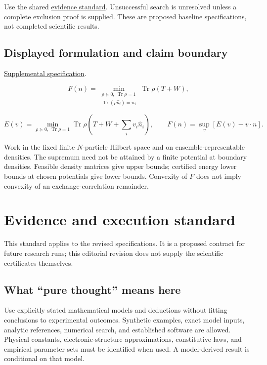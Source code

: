 \documentclass[
  11pt,
]{article}
\begin{document}
Use the shared
\href{https://github.com/rick-stevens-ai/Pure-Thought/blob/main/reviews/EVIDENCE-STANDARD.md}{evidence
standard}. Unsuccessful search is unresolved unless a complete exclusion
proof is supplied. These are proposed baseline specifications, not
completed scientific results.

\subsection{Displayed formulation and claim boundary}

\href{https://github.com/rick-stevens-ai/Pure-Thought/blob/main/supplemental/S05.md}{Supplemental
specification}.

\[F(n)=\min_{\substack{\rho\succeq0,\ \operatorname{Tr}\rho=1\\
\operatorname{Tr}(\rho\widehat n_i)=n_i}}
\operatorname{Tr}\rho(T+W),\]

\[E(v)=\min_{\rho\succeq0,\ \operatorname{Tr}\rho=1}
\operatorname{Tr}\rho\!\left(T+W+\sum_i v_i\widehat n_i\right),
\qquad F(n)=\sup_v[E(v)-v\cdot n].\]

Work in the fixed finite \(N\)-particle Hilbert space and on
ensemble-representable densities. The supremum need not be attained by a
finite potential at boundary densities. Feasible density matrices give
upper bounds; certified energy lower bounds at chosen potentials give
lower bounds. Convexity of \(F\) does not imply convexity of an
exchange-correlation remainder.

\section{Evidence and execution standard}

This standard applies to the revised specifications. It is a proposed
contract for future research runs; this editorial revision does not
supply the scientific certificates themselves.

\subsection{What ``pure thought'' means here}

Use explicitly stated mathematical models and deductions without fitting
conclusions to experimental outcomes. Synthetic examples, exact model
inputs, analytic references, numerical search, and established software
are allowed. Physical constants, electronic-structure approximations,
constitutive laws, and empirical parameter sets must be identified when
used. A model-derived result is conditional on that model.
\end{document}
